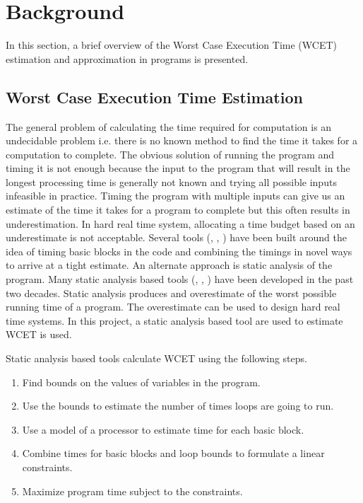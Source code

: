 \section{Background}
In this section, a brief overview of the Worst Case Execution Time (WCET) estimation and approximation in programs is presented.

\subsection{Worst Case Execution Time Estimation}
The general problem of calculating the time required for computation is an undecidable problem i.e. there is no known method to find the time it takes for a computation to complete. The obvious solution of running the program and timing it is not enough because the input to the program that will result in the longest processing time is generally not known and trying all possible inputs infeasible in practice. Timing the program with multiple inputs can give us an estimate of the time it takes for a program to complete but this often results in underestimation. In hard real time system, allocating a time budget based on an underestimate is not acceptable. Several tools (\cite{RapiTime}, \cite{Drops}, \cite{Wenzel}) have been built around the idea of timing basic blocks in the code and combining the timings in novel ways to arrive at a tight estimate. An alternate approach is static analysis of the program. Many static analysis based tools (\cite{AIT}, \cite{BoundT}, \cite{Chronos}) have been developed in the past two decades. Static analysis produces and overestimate of the worst possible running time of a program. The overestimate can be used to design hard real time systems. In this project, a static analysis based tool are used to estimate WCET is used.

Static analysis based tools calculate WCET using the following steps.
\begin{enumerate}
\item Find bounds on the values of variables in the program.
\item Use the bounds to estimate the number of times loops are going to run.
\item Use a model of a processor to estimate time for each basic block.
\item Combine times for basic blocks and loop bounds to formulate a linear constraints.
\item Maximize program time subject to the constraints.
\end{enumerate}

